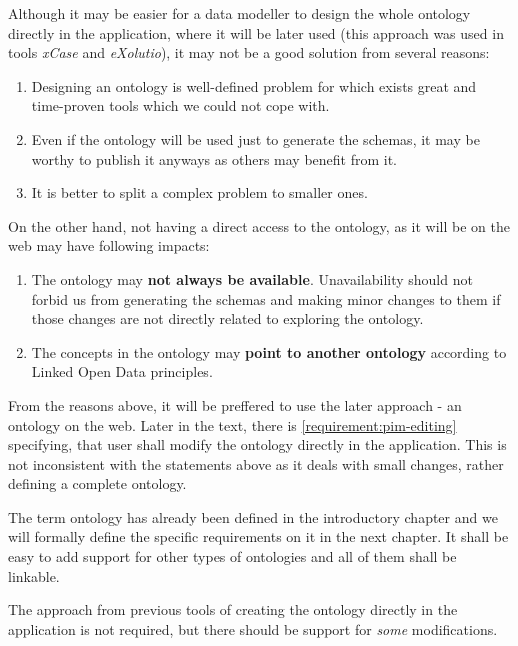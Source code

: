 Although it may be easier for a data modeller to design the whole ontology directly in the application, where it will be later used (this approach was used in tools \textit{xCase} and \textit{eXolutio}), it may not be a good solution from several reasons:

\begin{enumerate}
    \item Designing an ontology is well-defined problem for which exists great and time-proven tools which we could not cope with.
    \item Even if the ontology will be used just to generate the schemas, it may be worthy to publish it anyways as others may benefit from it.
    \item It is better to split a complex problem to smaller ones.
\end{enumerate}

On the other hand, not having a direct access to the ontology, as it will be on the web may have following impacts:

\begin{enumerate}
    \item The ontology may \textbf{not always be available}. Unavailability should not forbid us from generating the schemas and making minor changes to them if those changes are not directly related to exploring the ontology.
    \item The concepts in the ontology may \textbf{point to another ontology} according to Linked Open Data principles.
\end{enumerate}

From the reasons above, it will be preffered to use the later approach - an ontology on the web. Later in the text, there is \autoref{requirement:pim-editing} specifying, that user shall modify the ontology directly in the application. This is not inconsistent with the statements above as it deals with small changes, rather defining a complete ontology.

The term ontology has already been defined in the introductory chapter and we will formally define the specific requirements on it in the next chapter. It shall be easy to add support for other types of ontologies and all of them shall be linkable.


\begin{requirement}
    \label{requirement:pim-editing}
    The approach from previous tools of creating the ontology directly in the application is not required, but there should be support for \textit{some} modifications.
\end{requirement}

